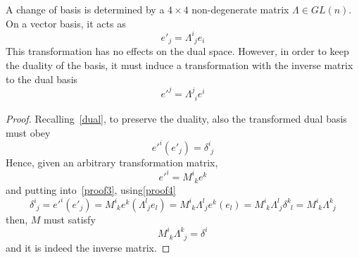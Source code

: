     A change of basis is determined by a $4 \times 4$ non-degenerate matrix $\Lambda \in GL(n)$. On a vector basis, it acts as 
    \begin{equation}\label{proof4}
        {e'}_j = \Lambda^i_{\phantom i j} e_i
    \end{equation}
    This transformation has no effects on the dual space. However, in order to keep the duality of the basis, it must induce a transformation with the inverse matrix to the dual basis
    \begin{equation*}
        {e'}^j = \Lambda^j_{\phantom j i} e^i
    \end{equation*}

    \begin{proof}
        Recalling~\eqref{dual}, to preserve the duality, also the transformed dual basis must obey 
        \begin{equation}\label{proof3}
            {e'}^i ({e'}_j) = \delta^i_{\phantom i j}
        \end{equation}
        Hence, given an arbitrary transformation matrix, 
        \begin{equation*}
            {e'}^i = M^i_{\phantom i k} e^k
        \end{equation*}
        and putting into~\eqref{proof3}, using\eqref{proof4}
        \begin{equation*}
            \delta^i_{\phantom i j} = {e'}^i ({e'}_j) = M^i_{\phantom i k} e^k (\Lambda^l_{\phantom l j} e_l) = M^i_{\phantom i k} \Lambda^l_{\phantom l j} e^k(e_l) = M^i_{\phantom i k} \Lambda^l_{\phantom l j} \delta^k_{\phantom k l} = M^i_{\phantom i k} \Lambda^k_{\phantom k j}
        \end{equation*}
        then, $M$ must satisfy
        \begin{equation*}
            M^i_{\phantom i k} \Lambda^k_{\phantom k j} = \delta^i_{\phantom j} 
        \end{equation*}
        and it is indeed the inverse matrix.
    \end{proof}

